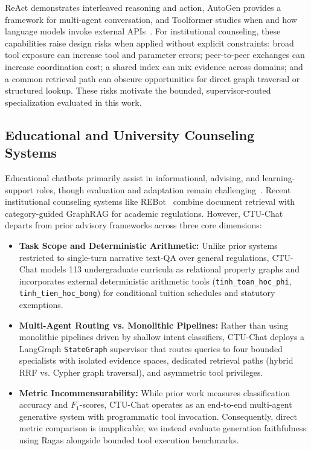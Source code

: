ReAct demonstrates interleaved reasoning and action, AutoGen provides a framework for multi-agent conversation, and Toolformer studies when and how language models invoke external APIs~\cite{yao2023react,wu2023autogen,schick2023toolformer}. For institutional counseling, these capabilities raise design risks when applied without explicit constraints: broad tool exposure can increase tool and parameter errors; peer-to-peer exchanges can increase coordination cost; a shared index can mix evidence across domains; and a common retrieval path can obscure opportunities for direct graph traversal or structured lookup. These risks motivate the bounded, supervisor-routed specialization evaluated in this work.

\subsection{Educational and University Counseling Systems}
\label{sec:educational_counseling}

Educational chatbots primarily assist in informational, advising, and learning-support roles, though evaluation and adaptation remain challenging~\cite{wollny2021chatbots}. Recent institutional counseling systems like REBot~\cite{ma2025rebot} combine document retrieval with category-guided GraphRAG for academic regulations. However, CTU-Chat departs from prior advisory frameworks across three core dimensions:

\begin{itemize}
    \item \textbf{Task Scope and Deterministic Arithmetic:} Unlike prior systems restricted to single-turn narrative text-QA over general regulations, CTU-Chat models 113 undergraduate curricula as relational property graphs and incorporates external deterministic arithmetic tools (\texttt{tinh\_toan\_hoc\_phi}, \texttt{tinh\_tien\_hoc\_bong}) for conditional tuition schedules and statutory exemptions.
    
    \item \textbf{Multi-Agent Routing vs. Monolithic Pipelines:} Rather than using monolithic pipelines driven by shallow intent classifiers, CTU-Chat deploys a LangGraph \texttt{StateGraph} supervisor that routes queries to four bounded specialists with isolated evidence spaces, dedicated retrieval paths (hybrid RRF vs. Cypher graph traversal), and asymmetric tool privileges.
    
    \item \textbf{Metric Incommensurability:} While prior work measures classification accuracy and $F_1$-scores, CTU-Chat operates as an end-to-end multi-agent generative system with programmatic tool invocation. Consequently, direct metric comparison is inapplicable; we instead evaluate generation faithfulness using Ragas alongside bounded tool execution benchmarks.
\end{itemize}

